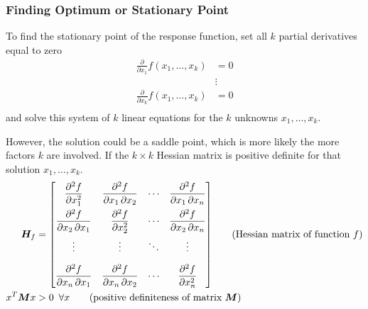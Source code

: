\documentclass[11pt]{article}
\theoremstyle{definition}
\begin{document}
\subsubsection{Finding Optimum or Stationary Point}
To find the stationary point of the response function, set all $k$ partial derivatives equal to zero
\begin{align*}
	\frac{\partial}{\partial x_1}f(x_1,\dots,x_k) &= 0\\
	&\vdots\\
	\frac{\partial}{\partial x_k}f(x_1,\dots,x_k) &= 0\\
\end{align*}
and solve this system of $k$ linear equations for the $k$ unknowns $x_1,\dots,x_k$.

However, the solution could be a saddle point, which is more likely the more factors $k$ are involved. If the $k\times k$ Hessian matrix is positive definite for that solution $x_1,\dots,x_k$.
\begin{align*}
	\bm{H}_f &= {\begin{bmatrix}{\dfrac {\partial ^{2}f}{\partial x_{1}^{2}}}&{\dfrac {\partial ^{2}f}{\partial x_{1}\,\partial x_{2}}}&\cdots &{\dfrac {\partial ^{2}f}{\partial x_{1}\,\partial x_{n}}}\\[2.2ex]{\dfrac {\partial ^{2}f}{\partial x_{2}\,\partial x_{1}}}&{\dfrac {\partial ^{2}f}{\partial x_{2}^{2}}}&\cdots &{\dfrac {\partial ^{2}f}{\partial x_{2}\,\partial x_{n}}}\\[2.2ex]\vdots &\vdots &\ddots &\vdots \\[2.2ex]{\dfrac {\partial ^{2}f}{\partial x_{n}\,\partial x_{1}}}&{\dfrac {\partial ^{2}f}{\partial x_{n}\,\partial x_{2}}}&\cdots &{\dfrac {\partial ^{2}f}{\partial x_{n}^{2}}}\end{bmatrix}} \tag{Hessian matrix of function $f$}\\
	x^T\bm{M}x &> 0\hspace*{0.5em}\forall x \tag{positive definiteness of matrix $\bm{M}$}
\end{align*}

\clearpage
\appendix
\end{document}
